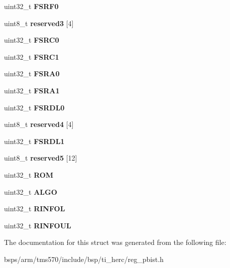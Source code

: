 \begin{DoxyCompactItemize}
uint32\+\_\+t {\bfseries F\+S\+R\+F0}
\item 
\mbox{\label{structtms570__pbist__t_afb915ad868976dc47ff5736e081bd314}} 
uint8\+\_\+t {\bfseries reserved3} \mbox{[}4\mbox{]}
\item 
\mbox{\label{structtms570__pbist__t_abde458bf49ee1da9b2986a649e4ce741}} 
uint32\+\_\+t {\bfseries F\+S\+R\+C0}
\item 
\mbox{\label{structtms570__pbist__t_a2eaa3b65769e298f144bc5d04f817975}} 
uint32\+\_\+t {\bfseries F\+S\+R\+C1}
\item 
\mbox{\label{structtms570__pbist__t_a4c103c48f7567c8c251c8cd65498067c}} 
uint32\+\_\+t {\bfseries F\+S\+R\+A0}
\item 
\mbox{\label{structtms570__pbist__t_a13b85ac78619e6cba234382e7e76c135}} 
uint32\+\_\+t {\bfseries F\+S\+R\+A1}
\item 
\mbox{\label{structtms570__pbist__t_a61625d502fb29d6cc43a5149926e215a}} 
uint32\+\_\+t {\bfseries F\+S\+R\+D\+L0}
\item 
\mbox{\label{structtms570__pbist__t_a24e6d9d06970a9ef05e6f1683a297c2d}} 
uint8\+\_\+t {\bfseries reserved4} \mbox{[}4\mbox{]}
\item 
\mbox{\label{structtms570__pbist__t_a9851926eccabd81d4b2c889b797a6444}} 
uint32\+\_\+t {\bfseries F\+S\+R\+D\+L1}
\item 
\mbox{\label{structtms570__pbist__t_ad6ab4ba26c0e7f8b71516502e1545b4b}} 
uint8\+\_\+t {\bfseries reserved5} \mbox{[}12\mbox{]}
\item 
\mbox{\label{structtms570__pbist__t_a9a4f5cb0651a37f247d19e098a97717e}} 
uint32\+\_\+t {\bfseries R\+OM}
\item 
\mbox{\label{structtms570__pbist__t_ae8c23a2c0baff9cb2ed316bd232b8165}} 
uint32\+\_\+t {\bfseries A\+L\+GO}
\item 
\mbox{\label{structtms570__pbist__t_ac95c99727b613b6ff59f90e4c74d06c2}} 
uint32\+\_\+t {\bfseries R\+I\+N\+F\+OL}
\item 
\mbox{\label{structtms570__pbist__t_aee66849e2e6d75d8fe1f92f2221d1bfd}} 
uint32\+\_\+t {\bfseries R\+I\+N\+F\+O\+UL}
\end{DoxyCompactItemize}


The documentation for this struct was generated from the following file\+:\begin{DoxyCompactItemize}
\item 
bsps/arm/tms570/include/bsp/ti\+\_\+herc/reg\+\_\+pbist.\+h\end{DoxyCompactItemize}
